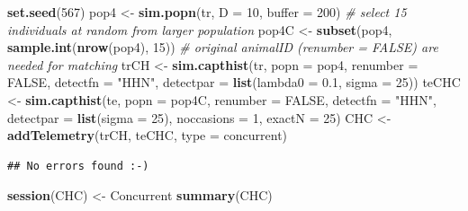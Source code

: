\documentclass[
]{book}
\newenvironment{Shaded}{\begin{snugshade}}{\end{snugshade}}
\newcommand{\AttributeTok}[1]{\textcolor[rgb]{0.13,0.29,0.53}{#1}}
\newcommand{\CommentTok}[1]{\textcolor[rgb]{0.56,0.35,0.01}{\textit{#1}}}
\newcommand{\ConstantTok}[1]{\textcolor[rgb]{0.56,0.35,0.01}{#1}}
\newcommand{\DecValTok}[1]{\textcolor[rgb]{0.00,0.00,0.81}{#1}}
\newcommand{\FloatTok}[1]{\textcolor[rgb]{0.00,0.00,0.81}{#1}}
\newcommand{\FunctionTok}[1]{\textcolor[rgb]{0.13,0.29,0.53}{\textbf{#1}}}
\newcommand{\NormalTok}[1]{#1}
\newcommand{\OtherTok}[1]{\textcolor[rgb]{0.56,0.35,0.01}{#1}}
\newcommand{\StringTok}[1]{\textcolor[rgb]{0.31,0.60,0.02}{#1}}
\begin{document}
\begin{Shaded}
\begin{Highlighting}[]
\FunctionTok{set.seed}\NormalTok{(}\DecValTok{567}\NormalTok{) }
\NormalTok{pop4 }\OtherTok{\textless{}{-}} \FunctionTok{sim.popn}\NormalTok{(tr, }\AttributeTok{D =} \DecValTok{10}\NormalTok{, }\AttributeTok{buffer =} \DecValTok{200}\NormalTok{)}
\CommentTok{\# select 15 individuals at random from larger population}
\NormalTok{pop4C }\OtherTok{\textless{}{-}} \FunctionTok{subset}\NormalTok{(pop4, }\FunctionTok{sample.int}\NormalTok{(}\FunctionTok{nrow}\NormalTok{(pop4), }\DecValTok{15}\NormalTok{))}
\CommentTok{\# original animalID (renumber = FALSE) are needed for matching}
\NormalTok{trCH }\OtherTok{\textless{}{-}} \FunctionTok{sim.capthist}\NormalTok{(tr,  }\AttributeTok{popn =}\NormalTok{ pop4, }\AttributeTok{renumber =} \ConstantTok{FALSE}\NormalTok{, }
    \AttributeTok{detectfn =} \StringTok{"HHN"}\NormalTok{, }\AttributeTok{detectpar =} \FunctionTok{list}\NormalTok{(}\AttributeTok{lambda0 =} \FloatTok{0.1}\NormalTok{, }
    \AttributeTok{sigma =} \DecValTok{25}\NormalTok{))}
\NormalTok{teCHC }\OtherTok{\textless{}{-}} \FunctionTok{sim.capthist}\NormalTok{(te, }\AttributeTok{popn =}\NormalTok{ pop4C, }\AttributeTok{renumber =} \ConstantTok{FALSE}\NormalTok{, }
    \AttributeTok{detectfn =} \StringTok{"HHN"}\NormalTok{, }\AttributeTok{detectpar =} \FunctionTok{list}\NormalTok{(}\AttributeTok{sigma =} \DecValTok{25}\NormalTok{), }\AttributeTok{noccasions =}
    \DecValTok{1}\NormalTok{, }\AttributeTok{exactN =} \DecValTok{25}\NormalTok{)}
\NormalTok{CHC }\OtherTok{\textless{}{-}} \FunctionTok{addTelemetry}\NormalTok{(trCH, teCHC, }\AttributeTok{type =} \StringTok{\textquotesingle{}concurrent\textquotesingle{}}\NormalTok{)}
\end{Highlighting}
\end{Shaded}

\begin{verbatim}
## No errors found :-)
\end{verbatim}

\begin{Shaded}
\begin{Highlighting}[]
\FunctionTok{session}\NormalTok{(CHC) }\OtherTok{\textless{}{-}} \StringTok{\textquotesingle{}Concurrent\textquotesingle{}}
\FunctionTok{summary}\NormalTok{(CHC)}
\end{Highlighting}
\end{Shaded}
\end{document}
